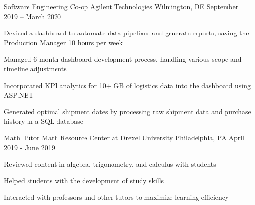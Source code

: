 \begin{cventries}
	\cventry
	{Software Engineering Co-op}
	{Agilent Technologies}
	{Wilmington, DE}
	{September 2019 – March 2020}
	{\begin{cvitems}
	    \item {Devised a dashboard to automate data pipelines and generate reports, saving the Production Manager 10 hours per week}
        \item {Managed 6-month dashboard-development process, handling various scope and timeline adjustments}
		\item {Incorporated KPI analytics for 10+ GB of logistics data into the dashboard using ASP.NET}
        \item {Generated optimal shipment dates by processing raw shipment data and purchase history in a SQL database}
		\end{cvitems}}
	
	
	\cventry
	{Math Tutor}
	{Math Resource Center at Drexel University}
	{Philadelphia, PA}
	{April 2019 - June 2019}
	{\begin{cvitems}
		\item { Reviewed content in algebra, trigonometry, and calculus with students }
		\item { Helped students with the development of study skills }
		\item { Interacted with professors and other tutors to maximize learning efficiency }
	\end{cvitems}}


\end{cventries}
